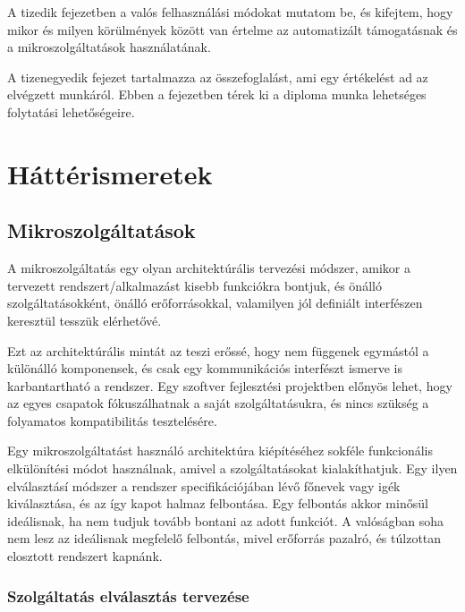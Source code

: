 \documentclass[11pt,magyar,a4paper,twoside,]{report}
\begin{document}
A tizedik fejezetben a valós felhasználási módokat mutatom be, és
kifejtem, hogy mikor és milyen körülmények között van értelme az
automatizált támogatásnak és a mikroszolgáltatások használatának.

A tizenegyedik fejezet tartalmazza az összefoglalást, ami egy értékelést
ad az elvégzett munkáról. Ebben a fejezetben térek ki a diploma munka
lehetséges folytatási lehetőségeire.

\chapter{Háttérismeretek}\label{huxe1ttuxe9rismeretek}

\section{Mikroszolgáltatások}\label{mikroszolguxe1ltatuxe1sok}

A mikroszolgáltatás\citep{microservices} \citep{micro-arch}
\citep{microservices-light} egy olyan architektúrális tervezési módszer,
amikor a tervezett rendszert/alkalmazást kisebb funkciókra bontjuk, és
önálló szolgáltatásokként, önálló erőforrásokkal, valamilyen jól
definiált interfészen keresztül tesszük elérhetővé.

Ezt az architektúrális mintát az teszi erőssé, hogy nem függenek
egymástól a különálló komponensek, és csak egy kommunikációs interfészt
ismerve is karbantartható a rendszer. Egy szoftver fejlesztési
projektben előnyös lehet, hogy az egyes csapatok fókuszálhatnak a saját
szolgáltatásukra, és nincs szükség a folyamatos kompatibilitás
tesztelésére.

Egy mikroszolgáltatást használó architektúra kiépítéséhez sokféle
funkcionális elkülönítési módot használnak, amivel a szolgáltatásokat
kialakíthatjuk. Egy ilyen elválasztásí módszer a rendszer
specifikációjában lévő főnevek vagy igék kiválasztása, és az így kapot
halmaz felbontása. Egy felbontás akkor minősül ideálisnak, ha nem tudjuk
tovább bontani az adott funkciót. A valóságban soha nem lesz az
ideálisnak megfelelő felbontás, mivel erőforrás pazalró, és túlzottan
elosztott rendszert kapnánk.

\subsection{\texorpdfstring{Szolgáltatás elválasztás
tervezése\label{splitting}}{Szolgáltatás elválasztás tervezése}}\label{szolguxe1ltatuxe1s-elvuxe1lasztuxe1s-tervezuxe9se}
\end{document}
